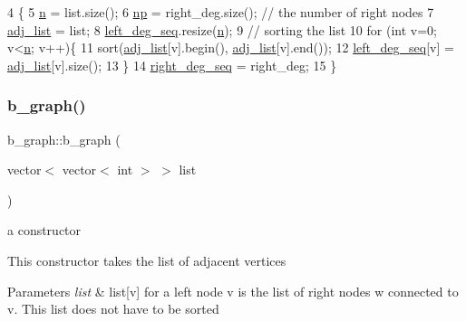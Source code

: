 \begin{DoxyCode}
4 \{
5   \hyperlink{classb__graph_a9e211d40c1799bc9b125de472ff06642}{n} = list.size();
6   \hyperlink{classb__graph_acffdd5f20329515eb6ec17ad24f1ca64}{np} = right\_deg.size(); \textcolor{comment}{// the number of right nodes}
7   \hyperlink{classb__graph_a2a89d2e8f958270952aab2e8769b7342}{adj\_list} = list;
8   \hyperlink{classb__graph_a311d16462dbb10c47b3a6c80a42139d9}{left\_deg\_seq}.resize(\hyperlink{classb__graph_a9e211d40c1799bc9b125de472ff06642}{n});
9   \textcolor{comment}{// sorting the list}
10   \textcolor{keywordflow}{for} (\textcolor{keywordtype}{int} v=0; v<\hyperlink{classb__graph_a9e211d40c1799bc9b125de472ff06642}{n}; v++)\{
11     sort(\hyperlink{classb__graph_a2a89d2e8f958270952aab2e8769b7342}{adj\_list}[v].begin(), \hyperlink{classb__graph_a2a89d2e8f958270952aab2e8769b7342}{adj\_list}[v].end());
12     \hyperlink{classb__graph_a311d16462dbb10c47b3a6c80a42139d9}{left\_deg\_seq}[v] = \hyperlink{classb__graph_a2a89d2e8f958270952aab2e8769b7342}{adj\_list}[v].size();
13   \}
14   \hyperlink{classb__graph_ae4c875ed6a583a78f38dfe958f20fad5}{right\_deg\_seq} = right\_deg;
15 \}
\end{DoxyCode}
\mbox{\label{classb__graph_af94e3bc6694a312f13c9305ec5ffe4ee}} 
\subsubsection{\texorpdfstring{b\+\_\+graph()}{b\_graph()}\hspace{0.1cm}{\footnotesize\ttfamily [3/3]}}
{\footnotesize\ttfamily b\+\_\+graph\+::b\+\_\+graph (\begin{DoxyParamCaption}\item[{vector$<$ vector$<$ int $>$ $>$}]{list }\end{DoxyParamCaption})}



a constructor 

This constructor takes the list of adjacent vertices 
\begin{DoxyParams}{Parameters}
{\em list} & list\mbox{[}v\mbox{]} for a left node v is the list of right nodes w connected to v. This list does not have to be sorted \\
\hline
\end{DoxyParams}

